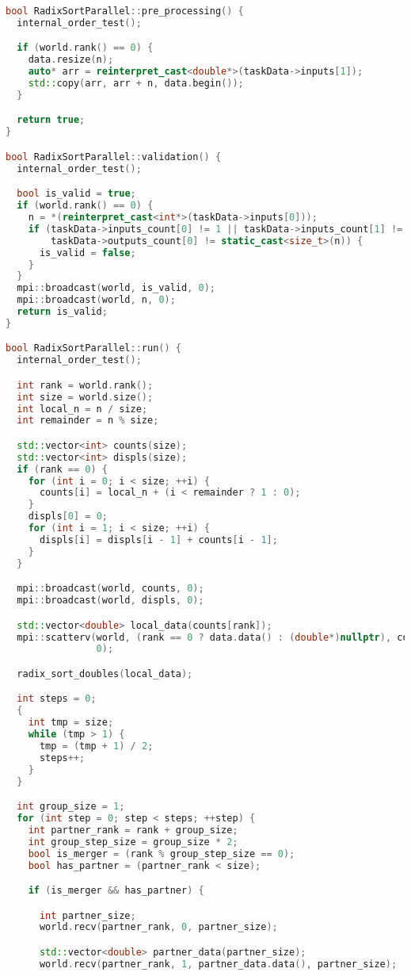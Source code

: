 \documentclass[a4paper,12pt]{article}
\begin{document}
\begin{lstlisting}[language=C++, caption={Реализация}]
bool RadixSortParallel::pre_processing() {
  internal_order_test();

  if (world.rank() == 0) {
    data.resize(n);
    auto* arr = reinterpret_cast<double*>(taskData->inputs[1]);
    std::copy(arr, arr + n, data.begin());
  }

  return true;
}

bool RadixSortParallel::validation() {
  internal_order_test();

  bool is_valid = true;
  if (world.rank() == 0) {
    n = *(reinterpret_cast<int*>(taskData->inputs[0]));
    if (taskData->inputs_count[0] != 1 || taskData->inputs_count[1] != static_cast<size_t>(n) ||
        taskData->outputs_count[0] != static_cast<size_t>(n)) {
      is_valid = false;
    }
  }
  mpi::broadcast(world, is_valid, 0);
  mpi::broadcast(world, n, 0);
  return is_valid;
}

bool RadixSortParallel::run() {
  internal_order_test();

  int rank = world.rank();
  int size = world.size();
  int local_n = n / size;
  int remainder = n % size;

  std::vector<int> counts(size);
  std::vector<int> displs(size);
  if (rank == 0) {
    for (int i = 0; i < size; ++i) {
      counts[i] = local_n + (i < remainder ? 1 : 0);
    }
    displs[0] = 0;
    for (int i = 1; i < size; ++i) {
      displs[i] = displs[i - 1] + counts[i - 1];
    }
  }

  mpi::broadcast(world, counts, 0);
  mpi::broadcast(world, displs, 0);

  std::vector<double> local_data(counts[rank]);
  mpi::scatterv(world, (rank == 0 ? data.data() : (double*)nullptr), counts, displs, local_data.data(), counts[rank],
                0);

  radix_sort_doubles(local_data);

  int steps = 0;
  {
    int tmp = size;
    while (tmp > 1) {
      tmp = (tmp + 1) / 2;
      steps++;
    }
  }

  int group_size = 1; 
  for (int step = 0; step < steps; ++step) {
    int partner_rank = rank + group_size;
    int group_step_size = group_size * 2;
    bool is_merger = (rank % group_step_size == 0); 
    bool has_partner = (partner_rank < size); 

    if (is_merger && has_partner) {

      int partner_size;
      world.recv(partner_rank, 0, partner_size);

      std::vector<double> partner_data(partner_size);
      world.recv(partner_rank, 1, partner_data.data(), partner_size);



\end{lstlisting}
\end{document}
